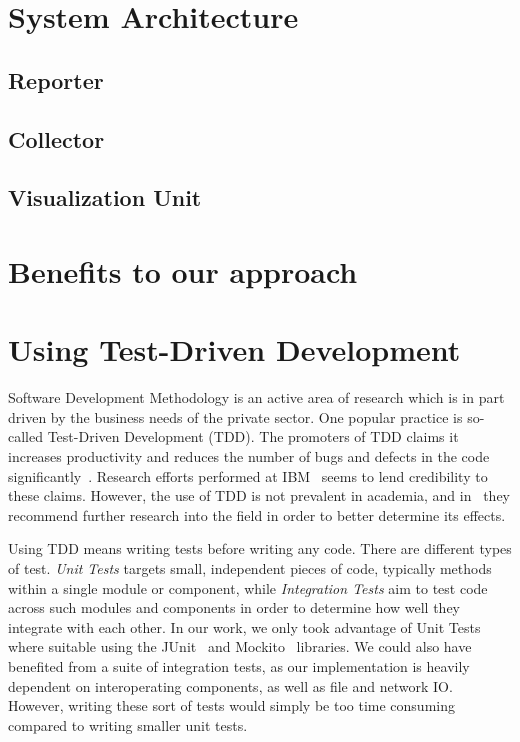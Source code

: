\section{System Architecture}





\subsection{Reporter}
\subsection{Collector}
\subsection{Visualization Unit}

\section{Benefits to our approach}

\section{Using Test-Driven Development}

Software Development Methodology is an active area of research
which is in part driven by the business needs of the private
sector\cite{janzen2005test}. One popular practice is so-called Test-Driven
Development (TDD). The promoters of TDD claims it increases
productivity and reduces the number of bugs and defects in the
code significantly~\cite{beck2003test}. Research
efforts performed at IBM~\cite{maximilien2003assessing} seems to
lend credibility to these claims. However, the use of TDD is not
prevalent in academia, and in~\cite{janzen2005test} they
recommend further research into the field in order to better
determine its effects.

Using TDD means writing tests before writing any code. There are
different types of test. \emph{Unit Tests} targets small,
independent pieces of code, typically methods within a single
module or component, while \emph{Integration Tests} aim to test
code across such modules and components in order to determine
how well they integrate with each other. In our work, we only
took advantage of Unit Tests where suitable using the
JUnit~\cite{junit} and Mockito~\cite{mockito} libraries.
We could also have benefited from a suite of integration tests,
as our implementation is heavily dependent on interoperating
components, as well as file and network IO\@. However, writing
these sort of tests would simply be too time consuming compared
to writing smaller unit tests.

